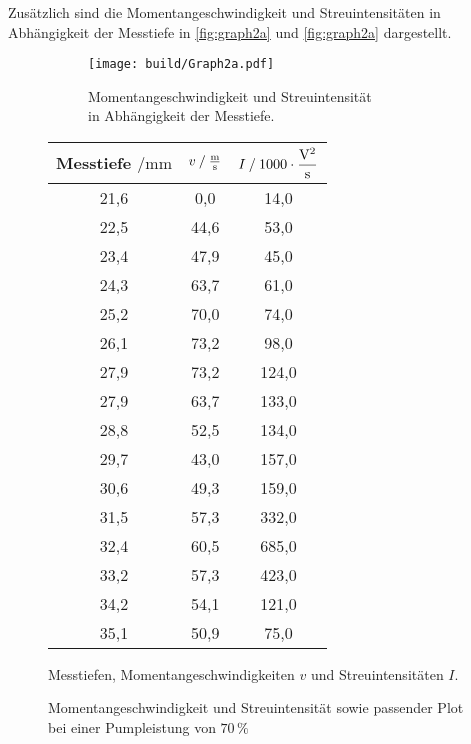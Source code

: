 Zusätzlich sind die Momentangeschwindigkeit und Streuintensitäten in Abhängigkeit der Messtiefe in \autoref{fig:graph2a} und \autoref{fig:graph2a} dargestellt.

\begin{figure}[H]
    \begin{subfigure}{0.57\textwidth} 
        \centering
        \texttt{[image: build/Graph2a.pdf]} 
        \caption{Momentangeschwindigkeit und Streuintensität \\ in Abhängigkeit der Messtiefe.}
        \label{fig:graph2a}
        \qquad
    \end{subfigure}
    \begin{subtable}{0.43\textwidth}
        \centering
       \begin{tabular}{c c c}
        \toprule 
        {Messtiefe $\mathbin{/} \unit{\milli\meter}$} & {$v \mathbin{/} \unit{\frac{\meter}{\second}} $} & {$I \mathbin{/} 1000 \cdot \unit{\dfrac{\volt^2}{\second}}$}  \\
        \midrule 
           21,6     &      0,0     &     14,0    \\
           22,5     &     44,6     &     53,0    \\
           23,4     &     47,9     &     45,0    \\
           24,3     &     63,7     &     61,0    \\
           25,2     &     70,0     &     74,0    \\
           26,1     &     73,2     &     98,0    \\
           27,9     &     73,2     &    124,0    \\
           27,9     &     63,7     &    133,0    \\
           28,8     &     52,5     &    134,0    \\
           29,7     &     43,0     &    157,0    \\
           30,6     &     49,3     &    159,0    \\
           31,5     &     57,3     &    332,0    \\
           32,4     &     60,5     &    685,0    \\
           33,2     &     57,3     &    423,0    \\
           34,2     &     54,1     &    121,0    \\
           35,1     &     50,9     &     75,0    \\
        \bottomrule
       \end{tabular}
       \caption{Messtiefen, Momentangeschwindigkeiten $v$ und Streuintensitäten $I$.}
        \label{tab:2a}  
    \end{subtable}
    \caption{Momentangeschwindigkeit und Streuintensität sowie passender Plot bei einer Pumpleistung von $70 \,\%$} 
\end{figure}    



